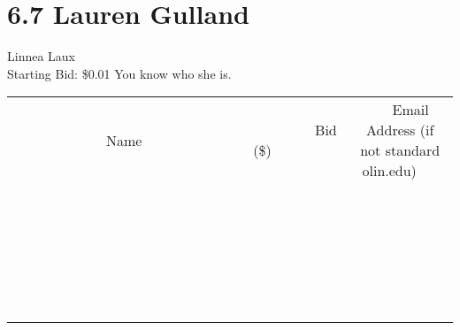 \documentclass[11pt]{article}
\begin{document}
\section*{6.7 Lauren Gulland}
Linnea Laux
\\
Starting Bid: \$0.01
\newline
You know who she is.
\\[6ex]
\begin{tabular}{c c c}
~~~~~~~~~~~~~Name~~~~~~~~~~~~~ & ~~~~~~~~~Bid (\$)~~~~~~~~~  & ~~~Email Address (if not standard olin.edu)~~~\\
 & & \\
\hline
 & & \\
\hline
 & & \\
\hline
 & & \\
\hline
 & & \\
\hline
 & & \\
\hline
 & & \\
\hline
 & & \\
\hline
 & & \\
\hline
 & & \\
\hline
 & & \\
\hline
 & & \\
\hline
 & & \\
\hline
 & & \\
\hline
 & & \\
\hline
 & & \\
\hline
 & & \\
\hline
 & & \\
\hline
 & & \\
\hline
 & & \\
\hline
 & & \\
\hline
 & & \\
\hline
 & & \\
\hline
 & & \\
\hline
 & & \\
\hline
 & & \\
\hline
\end{tabular}
\newpage
\end{document}
